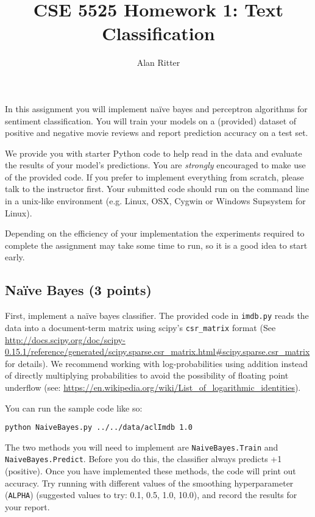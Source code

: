 \documentclass[12pt, letterpaper]{article}
\begin{document}
\title{CSE 5525 Homework 1: Text Classification}
\author{Alan Ritter}
\date{}
\maketitle
 
In this assignment you will implement na\"{i}ve bayes and perceptron algorithms for
sentiment classification.  You will train your models on a (provided) dataset of positive
and negative movie reviews and report prediction accuracy on a test set.

We provide you with starter Python code to help read in the data and evaluate the results of your model's predictions.
You are \emph{strongly} encouraged to make use of the provided code.  
If you prefer to implement everything from scratch, please talk to the instructor first.  Your submitted code
should run on the command line in a unix-like environment (e.g. Linux, OSX, Cygwin or Windows Supsystem for Linux).

Depending on the efficiency of your implementation the experiments required to complete the assignment may take some
time to run, so it is a good idea to start early.

\subsection*{Na\"{i}ve Bayes (3 points)}
First, implement a na\"{i}ve bayes classifier.  The provided code in {\tt imdb.py} reads the data into a document-term matrix
using scipy's {\tt csr\_matrix} format (See \url{http://docs.scipy.org/doc/scipy-0.15.1/reference/generated/scipy.sparse.csr_matrix.html#scipy.sparse.csr_matrix} for details).
We recommend working with log-probabilities using addition instead of directly multiplying probabilities to avoid the possibility of floating point underflow (see: \url{https://en.wikipedia.org/wiki/List_of_logarithmic_identities}).

You can run the sample code like so:
\begin{verbatim}
python NaiveBayes.py ../../data/aclImdb 1.0
\end{verbatim}

The two methods you will need to implement are {\tt NaiveBayes.Train} and {\tt NaiveBayes.Predict}.  Before you do this, the classifier always predicts +1 (positive).
Once you have implemented these methods, the code will print out accuracy.  Try running with different values of the smoothing hyperparameter ({\tt ALPHA}) (suggested values to try: 0.1, 0.5, 1.0, 10.0),
and record the results for your report.
\end{document}
